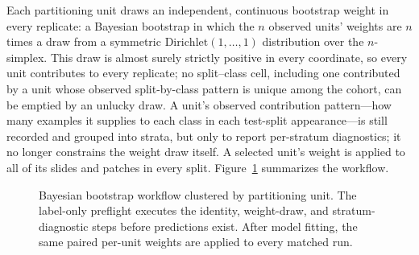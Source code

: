\documentclass[11pt]{article}
\begin{document}
Each partitioning unit draws an independent, continuous bootstrap weight in every replicate: a Bayesian bootstrap \citep{rubin1981bayesian} in which the $n$ observed units' weights are $n$ times a draw from a symmetric $\mathrm{Dirichlet}(1,\ldots,1)$ distribution over the $n$-simplex. This draw is almost surely strictly positive in every coordinate, so every unit contributes to every replicate; no split--class cell, including one contributed by a unit whose observed split-by-class pattern is unique among the cohort, can be emptied by an unlucky draw. A unit's observed contribution pattern---how many examples it supplies to each class in each test-split appearance---is still recorded and grouped into strata, but only to report per-stratum diagnostics; it no longer constrains the weight draw itself. A selected unit's weight is applied to all of its slides and patches in every split. Figure~\ref{fig:bootstrap-workflow} summarizes the workflow.

\begin{figure}[ht]
  \centering
  \caption{Bayesian bootstrap workflow clustered by partitioning unit. The label-only preflight executes the identity, weight-draw, and stratum-diagnostic steps before predictions exist. After model fitting, the same paired per-unit weights are applied to every matched run.}
  \label{fig:bootstrap-workflow}
\end{figure}
\end{document}
